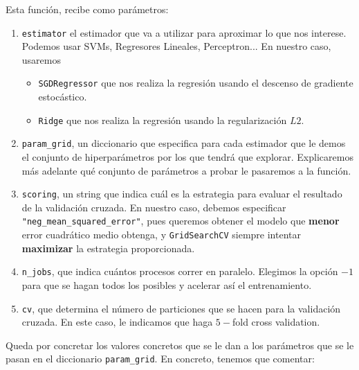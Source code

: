 \documentclass[a4paper, 20pt]{article}
\begin{document}
Esta función, recibe como parámetros:
\begin{enumerate}
\item \lstinline{estimator} el estimador que va a utilizar para aproximar lo que nos interese. Podemos usar SVMs, Regresores Lineales, Perceptron... En nuestro caso, usaremos
  \begin{itemize}
  \item \lstinline{SGDRegressor} que nos realiza la regresión usando el descenso de gradiente estocástico.
  \item \lstinline{Ridge} que nos realiza la regresión usando la regularización $L2$.
  \end{itemize}
\item \lstinline{param_grid}, un diccionario que especifica para cada estimador que le demos el conjunto de hiperparámetros por los que tendrá que explorar. Explicaremos más adelante qué conjunto de parámetros a probar le pasaremos a la función.
\item \lstinline{scoring}, un string que indica cuál es la estrategia para evaluar el resultado de la validación cruzada. En nuestro caso, debemos especificar \lstinline{"neg_mean_squared_error"}, pues queremos obtener el modelo que \textbf{menor} error cuadrático medio obtenga, y \lstinline{GridSearchCV} siempre intentar \textbf{maximizar} la estrategia proporcionada.
\item \lstinline{n_jobs}, que indica cuántos procesos correr en paralelo. Elegimos la opción $-1$ para que se hagan todos los posibles y acelerar así el entrenamiento.

\item \lstinline{cv}, que determina el número de particiones que se hacen para la validación cruzada. En este caso, le indicamos que haga $5-$fold cross validation.


\end{enumerate}



Queda por concretar los valores concretos que se le dan a los parámetros que se le pasan en el diccionario \lstinline{param_grid}. En concreto, tenemos que comentar:
\end{document}
